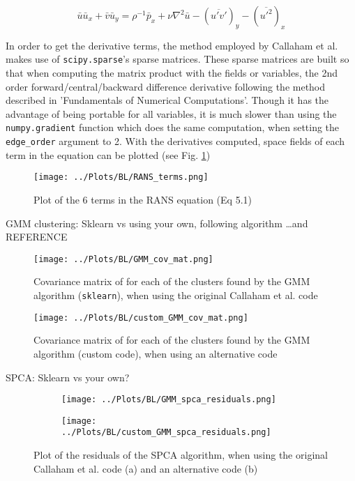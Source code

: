 \documentclass[12pt]{report} %
\begin{document}
\begin{equation}
  \bar{u} \bar{u}_x + \bar{v} \bar{u}_y = \rho^{-1} \bar{p}_x + \nu \nabla^2 \bar{u}  - (\overline{u' v'})_y - (\overline{u'^2})_x
\end{equation}

In order to get the derivative terms, the method employed by Callaham et al. makes use of \texttt{scipy.sparse}'s sparse matrices. These sparse matrices are built so that when computing the matrix product with the fields or variables, the 2nd order forward/central/backward difference derivative following the method described in 'Fundamentals of Numerical Computations'. Though it has the advantage of being portable for all variables, it is much slower than using the \texttt{numpy.gradient} function which does the same computation, when setting the \texttt{edge\_order} argument to 2. With the derivatives computed, space fields of each term in the equation can be plotted (see Fig. \ref{fig:RANS_terms})

\begin{figure}
  \centering
  \texttt{[image: ../Plots/BL/RANS\_terms.png]}
  \caption{Plot of the 6 terms in the RANS equation (Eq 5.1)}
  \label{fig:RANS_terms}
\end{figure}

GMM clustering:
Sklearn vs using your own, following algorithm \dots and REFERENCE

\begin{figure}
  \centering
  \texttt{[image: ../Plots/BL/GMM\_cov\_mat.png]}
  \caption{Covariance matrix of for each of the clusters found by the GMM algorithm (\texttt{sklearn}), when using the original Callaham et al. code}
  \label{fig:GMM_cov_mat}
\end{figure}

\begin{figure}
  \centering
  \texttt{[image: ../Plots/BL/custom\_GMM\_cov\_mat.png]}
  \caption{Covariance matrix of for each of the clusters found by the GMM algorithm (custom code), when using an alternative code}
  \label{fig:custom_GMM_cov_mat}
\end{figure}

SPCA:
Sklearn vs your own?

\begin{figure}
  \centering
  \begin{subfigure}[b]{0.45\textwidth}
      \texttt{[image: ../Plots/BL/GMM\_spca\_residuals.png]}
      \caption{}
  \end{subfigure}
  \hfill
  \begin{subfigure}[b]{0.45\textwidth}
      \texttt{[image: ../Plots/BL/custom\_GMM\_spca\_residuals.png]}
      \caption{}
  \end{subfigure}
  \caption{Plot of the residuals of the SPCA algorithm, when using the original Callaham et al. code (a) and an alternative code (b)}
  \label{fig:SPCA_residuals}
\end{figure}
\end{document}
